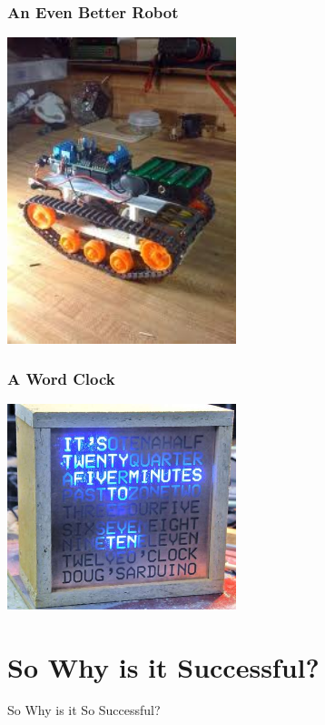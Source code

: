 \documentclass[yellow]{beamer}
\begin{document}
\begin{frame}
\frametitle{An Even Better Robot}
\begin{center}
	\includegraphics[width=0.5\textwidth]{images-1.jpeg}
\end{center}
\end{frame}

\begin{frame}
\frametitle{A Word Clock}
\begin{center}
	\includegraphics[width=0.5\textwidth]{wordclock.jpg}
\end{center}
\end{frame}

\section{So Why is it Successful?}

\begin{frame}
\begin{center}\huge So Why is it So Successful?
\end{center}
\end{frame}
\end{document}
